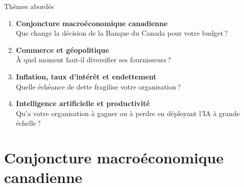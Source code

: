 \documentclass[aspectratio=169]{beamer}
\begin{document}
\begin{frame}{Thèmes abordés}
  \begin{enumerate}
    \setlength\itemsep{.52cm}
    \item \textbf{Conjoncture macroéconomique canadienne}\\
      {\small Que change la décision de la Banque du Canada pour votre budget\,?}
    \item \textbf{Commerce et géopolitique}\\
      {\small À quel moment faut-il diversifier ses fournisseurs\,?}
    \item \textbf{Inflation, taux d’intérêt et endettement}\\
      {\small Quelle échéance de dette fragilise votre organisation\,?}
    \item \textbf{Intelligence artificielle et productivité}\\
      {\small Qu’a votre organisation à gagner ou à perdre en déployant l’IA à grande échelle\,?}
  \end{enumerate}
\end{frame}


\section{Conjoncture macroéconomique canadienne}
\end{document}
